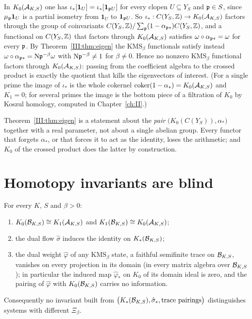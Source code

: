 \begin{corollary}\label{III:cor:annih}
In $K_0(\mathcal{A}_{K,S})$ one has $\iota_*[\mathbf 1_U]=\iota_*[\mathbf 1_{\mathfrak{p} U}]$ for every
clopen $U\subseteq Y_S$ and $\mathfrak{p}\in S$, since $\mu_{\mathfrak{p}}\mathbf 1_U$ is a partial isometry from
$\mathbf 1_U$ to $\mathbf 1_{\mathfrak{p} U}$. So $\iota_*:C(Y_S,\mathbb{Z})\to K_0(\mathcal{A}_{K,S})$ factors
through the group of coinvariants $C(Y_S,\mathbb{Z})/\sum_{\mathfrak{p}}(1-\alpha_{\mathfrak{p}*})C(Y_S,\mathbb{Z})$, and a
functional on $C(Y_S,\mathbb{Z})$ that factors through $K_0(\mathcal{A}_{K,S})$ satisfies
$\omega\circ\alpha_{\mathfrak{p}*}=\omega$ for every $\mathfrak{p}$. By Theorem~\ref{III:thm:eigen} the
$\mathrm{KMS}_\beta$ functionals satisfy instead $\omega\circ\alpha_{\mathfrak{p}*}=\mathrm{N}\mathfrak{p}^{-\beta}\omega$
with $\mathrm{N}\mathfrak{p}^{-\beta}\ne1$ for $\beta\ne0$. Hence no nonzero $\mathrm{KMS}_\beta$ functional
factors through $K_0(\mathcal{A}_{K,S})$: passing from the coefficient algebra to the crossed
product is exactly the quotient that kills the eigenvectors of interest. (For a single
prime the image of $\iota_*$ is the whole cokernel $\operatorname{coker}(1-\alpha_*)=K_0(\mathcal{A}_{K,S})$ and
$K_1=0$; for several primes the image is the bottom piece of a filtration of $K_0$ by Koszul
homology, computed in Chapter~\ref{ch:II}.)
\end{corollary}

\begin{remark}\label{III:rem:pair}
Theorem~\ref{III:thm:eigen} is a statement about the \emph{pair} $\bigl(K_0(C(Y_S)),\alpha_*\bigr)$
together with a real parameter, not about a single abelian group. Every functor that forgets
$\alpha_*$, or that forces it to act as the identity, loses the arithmetic; and
$K_0$ of the crossed product does the latter by construction.
\end{remark}

\section{Homotopy invariants are blind}\label{III:sec:homotopy}

\begin{theorem}\label{III:thm:core}
For every $K$, $S$ and $\beta>0$:
\begin{enumerate}
\item $K_0(\mathcal{B}_{K,S})\cong K_1(\mathcal{A}_{K,S})$ and $K_1(\mathcal{B}_{K,S})\cong K_0(\mathcal{A}_{K,S})$;
\item the dual flow $\hat\sigma$ induces the identity on $K_*(\mathcal{B}_{K,S})$;
\item the dual weight $\hat\varphi$ of any $\mathrm{KMS}_\beta$ state, a faithful
semifinite trace on $\mathcal{B}_{K,S}$, vanishes on every projection in its domain (in every
matrix algebra over $\mathcal{B}_{K,S}$); in particular the induced map $\hat\varphi_*$ on $K_0$ of
its domain ideal is zero, and the pairing of $\hat\varphi$ with $K_0(\mathcal{B}_{K,S})$ carries no
information.
\end{enumerate}
Consequently no invariant built from $\bigl(K_*(\mathcal{B}_{K,S}),\hat\sigma_*,\text{trace pairings}\bigr)$
distinguishes systems with different $\Xi_\beta$.
\end{theorem}

